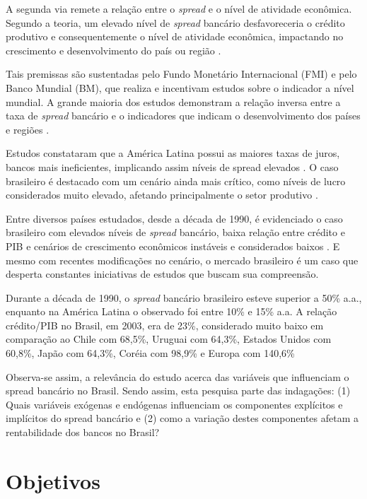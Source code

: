 \documentclass[12pt,12pt,openright,oneside,a4paper,chapter=TITLE,section=TITLE,subsection=TITLE,subsubsection=TITLE english,french,spanish,portugues,sumario=tradicional]{abntex2}
\begin{document}
A segunda via remete a relação entre o \emph{spread} e o nível de atividade
econômica. Segundo a teoria, um elevado nível de \emph{spread} bancário
desfavoreceria o crédito produtivo e consequentemente o nível de atividade
econômica, impactando no crescimento e desenvolvimento do país ou região \cite{WB:2005} \cite{dantas:2012} \cite{leal:2006}.

Tais premissas são sustentadas pelo Fundo Monetário Internacional (FMI) e pelo
Banco Mundial (BM), que realiza e incentivam estudos sobre o indicador a
nível mundial. A grande maioria dos estudos demonstram a relação inversa entre a taxa de \emph{spread} bancário e o indicadores que indicam o desenvolvimento dos
países e regiões \cite{WB:2005}.

Estudos constataram que a América Latina possui as maiores taxas de juros, bancos mais ineficientes, implicando assim níveis de spread elevados \cite{dantas:2012}. O caso brasileiro é destacado com um cenário ainda mais crítico, como níveis de lucro considerados muito elevado, afetando principalmente o setor produtivo \cite{dantas:2012}.

Entre diversos países estudados, desde a década de 1990, é evidenciado o caso brasileiro com elevados níveis de \emph{spread} bancário, baixa relação entre crédito e PIB e cenários de crescimento econômicos instáveis e considerados baixos \cite{levine:1997, matos:2003}. E mesmo com recentes modificações no cenário, o mercado brasileiro é um caso que desperta constantes iniciativas de estudos que buscam sua compreensão.

Durante a década de 1990, o \emph{spread} bancário brasileiro esteve superior a 50\% a.a., enquanto na América Latina o observado foi entre 10\% e 15\% a.a. A relação crédito/PIB no Brasil, em 2003, era de 23\%, considerado muito baixo em comparação ao Chile com 68,5\%, Uruguai com 64,3\%, Estados Unidos com 60,8\%, Japão com 64,3\%, Coréia com 98,9\% e Europa com 140,6\% \cite{camargo:2009,leal:2006}

Observa-se assim, a relevância do estudo acerca das variáveis que influenciam o spread bancário no Brasil. Sendo assim, esta pesquisa parte das indagações: (1) Quais variáveis exógenas e endógenas influenciam os componentes explícitos e implícitos do spread bancário e (2) como a variação destes componentes afetam a rentabilidade dos bancos no Brasil?

\section{Objetivos}
\end{document}
